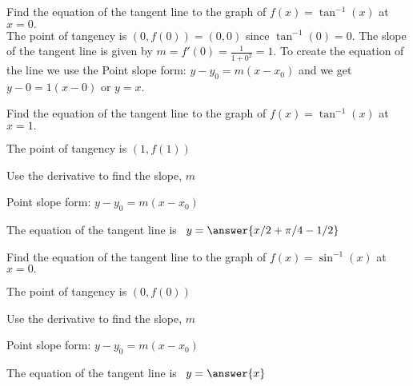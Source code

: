 \documentclass{ximera}
\begin{document}
\begin{example} %

Find the equation of the tangent line to the graph of $f(x) = \tan^{-1}(x)$ at $x=0.$\\
The point of tangency is $(0, f(0)) = (0, 0)$ since $\tan^{-1}(0) = 0$.
The slope of the tangent line is given by  $m = f'(0) = \tfrac{1}{1+0^2} = 1$.
To create the equation of the line we use the
Point slope form: $y-y_0 = m(x-x_0)$ and we get $y-0 = 1(x-0)$ or $y=x$.

\end{example}





\begin{problem} %

Find the equation of the tangent line to the graph of $f(x) = \tan^{-1}(x)$ at $x=1.$

\begin{hint}
The point of tangency is $(1, f(1))$
\end{hint}
\begin{hint}
Use the derivative to find the slope, $m$
\end{hint}
\begin{hint}
Point slope form: $y-y_0 = m(x-x_0)$
\end{hint}

The equation of the tangent line is \ $y = \answer{x/2 + \pi/4 - 1/2}$

\end{problem}



\begin{problem} %

Find the equation of the tangent line to the graph of $f(x) = \sin^{-1}(x)$ at $x=0.$

\begin{hint}
The point of tangency is $(0, f(0))$
\end{hint}
\begin{hint}
Use the derivative to find the slope, $m$
\end{hint}
\begin{hint}
Point slope form: $y-y_0 = m(x-x_0)$
\end{hint}

The equation of the tangent line is \ $y = \answer{x}$

\end{problem}
\end{document}
